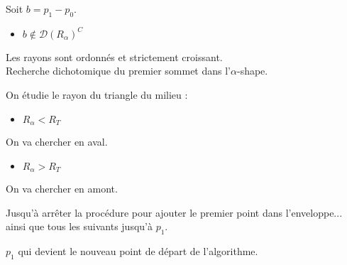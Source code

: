 \begin{frame}
\begin{columns}[t]
\begin{column}{3cm}
\begin{block}{}
{        }
        {
          Soit $b = p_{1} - p_{0}$.
          \begin{itemize}
            \item $b \notin \mathcal{D} \left( R_{\alpha} \right)^C$
          \end{itemize}

        }
        {
          Les rayons sont ordonnés et strictement croissant.\\
          \alert{Recherche dichotomique} du premier sommet dans l'$\alpha$-shape.\\
        }        
        {
          On étudie le rayon du triangle du milieu :
          \begin{itemize}
            \item $R_{\alpha} < R_T$
          \end{itemize}
          On va chercher en aval.
        }
        {
          \begin{itemize}
            \item $R_{\alpha} > R_T$
          \end{itemize}
          On va chercher en amont.
        }
        {
          Jusqu'à arrêter la procédure pour ajouter le premier point dans l'enveloppe...\\          
        }
        {
          ainsi que tous les suivants jusqu'à $p_1$.     
        }
        {
          $p_1$ qui devient le nouveau point de départ de l'algorithme.
          
        }  
      \end{block}
     
    \end{column}
  \end{columns}

\end{frame}


